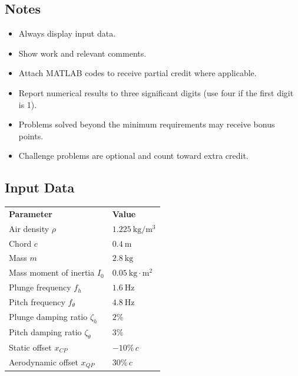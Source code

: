\documentclass[12pt]{article}
\begin{document}
\subsection*{Notes}
\begin{tcolorbox}[colback=white,colframe=black,colbacktitle=gray!20!white,
                  coltitle=black,sharp corners,boxrule=1pt,
                  title=Submission Notes]
\begin{itemize}[leftmargin=1.2em]
  \item Always display input data.
  \item Show work and relevant comments.
  \item Attach MATLAB codes to receive partial credit where applicable.
  \item Report numerical results to three significant digits (use four if the first digit is 1).
  \item Problems solved beyond the minimum requirements may receive bonus points.
  \item Challenge problems are optional and count toward extra credit.
\end{itemize}
\end{tcolorbox}

\subsection*{Input Data}
\begin{tcolorbox}[colback=white,colframe=black,colbacktitle=gray!20!white,
                  coltitle=black,sharp corners,boxrule=1pt,
                  title=Input Data Summary]
\begin{tabular}{@{}ll@{}}
\textbf{Parameter} & \textbf{Value} \\
Air density $\rho$ & $1.225~\mathrm{kg/m^3}$ \\
Chord $c$ & $0.4~\mathrm{m}$ \\
Mass $m$ & $2.8~\mathrm{kg}$ \\
Mass moment of inertia $I_0$ & $0.05~\mathrm{kg\cdot m^2}$ \\
Plunge frequency $f_h$ & $1.6~\mathrm{Hz}$ \\
Pitch frequency $f_\theta$ & $4.8~\mathrm{Hz}$ \\
Plunge damping ratio $\zeta_h$ & $2\%$ \\
Pitch damping ratio $\zeta_\theta$ & $3\%$ \\
Static offset $x_{CP}$ & $-10\%\,c$ \\
Aerodynamic offset $x_{QP}$ & $30\%\,c$ \\
\end{tabular}
\end{tcolorbox}
\end{document}
